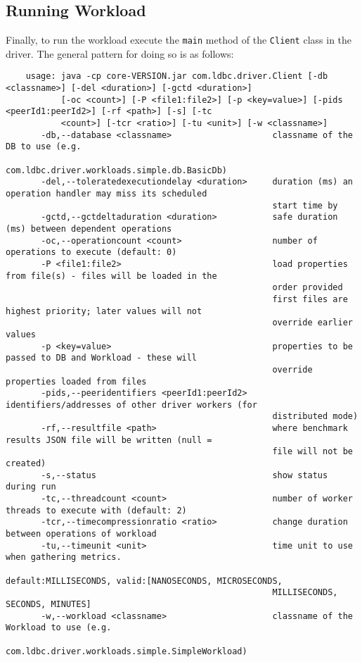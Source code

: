 \subsection{Running Workload} 
\label{sub:running_workload}

Finally, to run the workload execute the \texttt{main} method of the \texttt{Client} class in the driver.
The general pattern for doing so is as follows:

{\footnotesize
	\begin{verbatim}
	usage: java -cp core-VERSION.jar com.ldbc.driver.Client [-db <classname>] [-del <duration>] [-gctd <duration>]
	       [-oc <count>] [-P <file1:file2>] [-p <key=value>] [-pids <peerId1:peerId2>] [-rf <path>] [-s] [-tc
	       <count>] [-tcr <ratio>] [-tu <unit>] [-w <classname>]
	   -db,--database <classname>                    classname of the DB to use (e.g.
	                                                 com.ldbc.driver.workloads.simple.db.BasicDb)
	   -del,--toleratedexecutiondelay <duration>     duration (ms) an operation handler may miss its scheduled
	                                                 start time by
	   -gctd,--gctdeltaduration <duration>           safe duration (ms) between dependent operations
	   -oc,--operationcount <count>                  number of operations to execute (default: 0)
	   -P <file1:file2>                              load properties from file(s) - files will be loaded in the
	                                                 order provided
	                                                 first files are highest priority; later values will not
	                                                 override earlier values
	   -p <key=value>                                properties to be passed to DB and Workload - these will
	                                                 override properties loaded from files
	   -pids,--peeridentifiers <peerId1:peerId2>     identifiers/addresses of other driver workers (for
	                                                 distributed mode)
	   -rf,--resultfile <path>                       where benchmark results JSON file will be written (null =
	                                                 file will not be created)
	   -s,--status                                   show status during run
	   -tc,--threadcount <count>                     number of worker threads to execute with (default: 2)
	   -tcr,--timecompressionratio <ratio>           change duration between operations of workload
	   -tu,--timeunit <unit>                         time unit to use when gathering metrics.
	                                                 default:MILLISECONDS, valid:[NANOSECONDS, MICROSECONDS,
	                                                 MILLISECONDS, SECONDS, MINUTES]
	   -w,--workload <classname>                     classname of the Workload to use (e.g.
	                                                 com.ldbc.driver.workloads.simple.SimpleWorkload)
	\end{verbatim}
}

